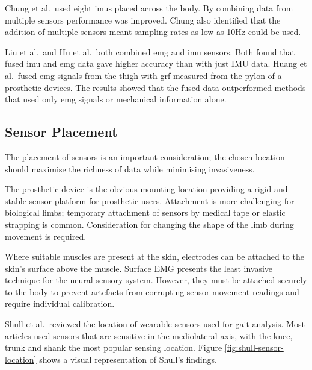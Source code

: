 Chung et al.~used eight \acrshort{imu}s placed across the body. By combining data from multiple sensors performance was improved. Chung also identified that the addition of multiple sensors meant sampling rates as low as 10Hz could be used. \cite{Chung2019}

Liu et al.~and Hu et al.~both combined \acrshort{emg} and \acrshort{imu} sensors. Both found that fused \acrshort{imu} and \acrshort{emg} data gave higher accuracy than with just IMU data.\cite{Hu2021, Liu2021} Huang et al.~fused \acrshort{emg} signals from the thigh with \acrshort{grf} measured from the pylon of a prosthetic devices. The results showed that the fused data outperformed methods that used only \acrshort{emg} signals or mechanical information alone.\cite{Huang2011}


\subsection{Sensor Placement}
The placement of sensors is an important consideration; the chosen location should maximise the richness of data while minimising invasiveness\cite{Tucker2015}.

The prosthetic device is the obvious mounting location providing a rigid and stable sensor platform for prosthetic users. Attachment is more challenging for biological limbs; temporary attachment of sensors by medical tape or elastic strapping is common. Consideration for changing the shape of the limb during movement is required.

Where suitable muscles are present at the skin, electrodes can be attached to the skin's surface above the muscle. Surface EMG presents the least invasive technique for the neural sensory system. However, they must be attached securely to the body to prevent artefacts from corrupting sensor movement readings and require individual calibration.

Shull et al.~reviewed the location of wearable sensors used for gait analysis. Most articles used sensors that are sensitive in the mediolateral axis, with the knee, trunk and shank the most popular sensing location. Figure \ref{fig:shull-sensor-location} shows a visual representation of Shull's findings.

